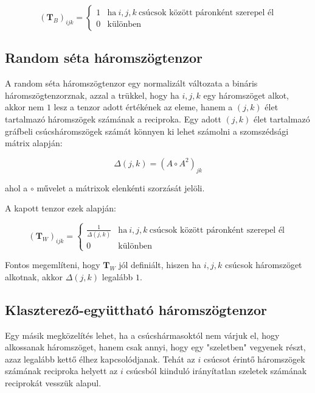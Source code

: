 \documentclass[12pt,numbers=noenddot]{report}
\begin{document}
\begin{equation}
	(\boldsymbol{T}_B)_{ijk} = 
		\begin{cases}
			1 & \text{ha} ~ i, j, k ~ \text{csúcsok között páronként szerepel él} \\
			0 & \text{különben}
		\end{cases}
\end{equation}

\pagebreak

\subsection*{Random séta háromszögtenzor}

A random séta háromszögtenzor egy normalizált változata a bináris 
háromszögtenzorznak, azzal a trükkel, hogy ha $i, j, k$ egy háromszöget alkot,
akkor nem $1$ lesz a tenzor adott értékének az eleme, hanem a $(j,k)$ élet
tartalmazó háromszögek számának a reciproka.
Egy adott $(j,k)$ élet tartalmazó gráfbeli csúcsháromszögek számát könnyen ki 
lehet számolni a szomszédsági mátrix alapján:

$$\Delta(j,k) = (A \circ A^2)_{jk}$$

\noindent
ahol a $\circ$ művelet a mátrixok elenkénti szorzását jelöli.

A kapott tenzor ezek alapján:

\begin{equation}
	(\boldsymbol{T}_W)_{ijk} = 
		\begin{cases}
			\frac{1}{\Delta(j,k)} & \text{ha} ~ i, j, k ~ \text{csúcsok között páronként szerepel él} \\
			0 & \text{különben}
		\end{cases}
\end{equation}

Fontos megemlíteni, hogy $\boldsymbol{T}_W$ jól definiált, hiszen ha 
$i, j, k$ csúcsok háromszöget alkotnak, akkor $\Delta(j,k)$ legalább $1$.


\subsection*{Klaszterező-együttható háromszögtenzor}

Egy másik megközelítés lehet, ha a csúcshármasoktól nem várjuk el, hogy 
alkossanak háromszöget, hanem csak annyi, hogy egy "szeletben" vegyenek részt,
azaz legalább kettő élhez kapcsolódjanak.
Tehát az $i$ csúcsot érintő háromszögek számának reciproka helyett az $i$ 
csúcsból kiinduló irányítatlan szeletek számának reciprokát vesszük alapul.
\end{document}
